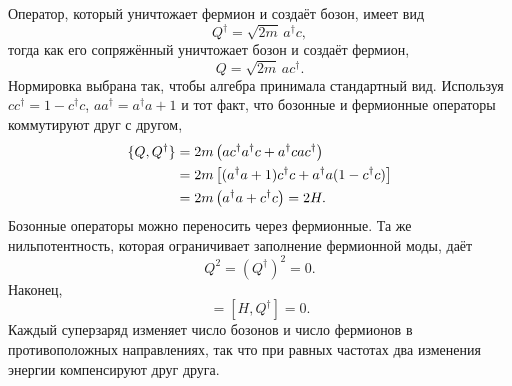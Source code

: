 Оператор, который уничтожает фермион и создаёт бозон, имеет вид
\begin{equation}
Q^\dagger=\sqrt{2m}\,a^\dagger c,
\end{equation}
тогда как его сопряжённый уничтожает бозон и создаёт фермион,
\begin{equation}
Q=\sqrt{2m}\,a c^\dagger.
\end{equation}
Нормировка выбрана так, чтобы алгебра принимала стандартный вид. Используя \(cc^\dagger=1-c^\dagger c\), \(aa^\dagger=a^\dagger a+1\) и тот факт, что бозонные и фермионные операторы коммутируют друг с другом,
\begin{align}
\{Q,Q^\dagger\}
&=2m\left(ac^\dagger a^\dagger c+a^\dagger c a c^\dagger\right)\notag\\
&=2m\left[(a^\dagger a+1)c^\dagger c
+a^\dagger a(1-c^\dagger c)\right]\notag\\
&=2m\left(a^\dagger a+c^\dagger c\right)=2H.
\label{eq:l7-superalgebra}
\end{align}
Бозонные операторы можно переносить через фермионные. Та же нильпотентность, которая ограничивает заполнение фермионной моды, даёт
\begin{equation}
Q^2=(Q^\dagger)^2=0.
\end{equation}
Наконец,
\begin{equation}
[H,Q]=[H,Q^\dagger]=0.
\label{eq:l7-conserved-supercharges}
\end{equation}
Каждый суперзаряд изменяет число бозонов и число фермионов в противоположных направлениях, так что при равных частотах два изменения энергии компенсируют друг друга.

\begin{classroomqa}
\end{classroomqa}

\begin{classroomqa}
\end{classroomqa}

